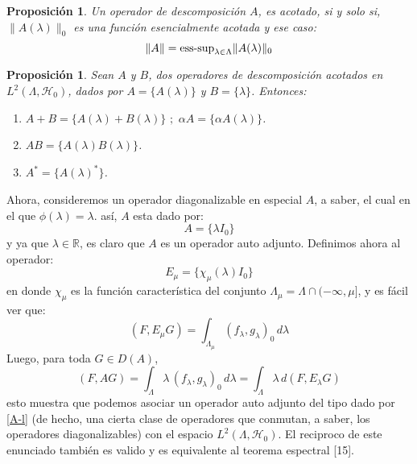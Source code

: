 \documentclass[12pt]{book}
\numberwithin{equation}{chapter}
\newtheorem{proposition}[theorem]{Proposici\'on}
\def\R{\mathbb{R}}
\def\H{\mathcal{H}}
\begin{document}
\begin{proposition}
Un operador de descomposici\'on $A$, es acotado, si y solo si, $\| A(\lambda) \|_{0}$ es una funci\'on esencialmente acotada y ese caso:
\begin{equation}
\| A \| = \hbox{ess-sup}_{\lambda \in \Lambda} \| A(\lambda) \|_{0}
\end{equation}
\end{proposition}

\vspace{5 mm}

\begin{proposition}
Sean $A$ y $B$, dos operadores de descomposici\'on acotados en $L^{2}(\Lambda , \H_{0})$, dados por $A= \{ A(\lambda) \}$ y $B= \{ \lambda \}$. Entonces:
\begin{enumerate}
\item $A + B = \{ A(\lambda) + B(\lambda) \} \,\,;\,\, \alpha A = \{ \alpha A(\lambda) \}$.
\item $AB= \{ A(\lambda) B(\lambda) \}$.
\item $A^{*} = \{ A(\lambda)^{*} \}$.
\end{enumerate}
\end{proposition}

\vspace{5 mm}

Ahora, consideremos un operador diagonalizable en especial $A$, a saber, el cual en el que $\phi (\lambda)= \lambda$. as\'i, $A$ esta dado por:
\begin{equation}\label{A-l}
A= \{ \lambda I_{0} \}
\end{equation}
y ya que $\lambda \in \R$, es claro que $A$ es un operador auto adjunto. Definimos ahora al operador:
\begin{equation}
E_{\mu}= \{ \chi_{\mu}(\lambda)I_{0} \}
\end{equation}
en donde $\chi_{\mu}$ es la funci\'on caracter\'istica del conjunto $\Lambda_{\mu}= \Lambda \cap ( -\infty , \mu ]$, y es f\'acil ver que:
\begin{equation}
( F , E_{\mu}G )= \int_{\Lambda_{\mu}} ( f_{\lambda}, g_{\lambda} )_{0}\, d\lambda
\end{equation}
Luego, para toda $G \in D(A)$, 
\begin{equation}
(F,AG) = \int_{\Lambda} \lambda \, (f_{\lambda} , g_{\lambda})_{0}\, d\lambda = \int_{\Lambda} \lambda \, d(F,E_{\lambda} G)
\end{equation}
esto muestra que podemos asociar un operador auto adjunto del tipo dado por \eqref{A-l} (de hecho, una cierta clase de operadores que conmutan, a saber, los operadores diagonalizables) con el espacio $L^{2}(\Lambda , \H_{0})$. El reciproco de este enunciado tambi\'en es valido y es equivalente al teorema espectral [15].\\
\end{document}
